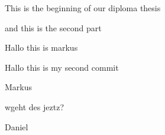 \documentclass[11pt]{scrartcl}
\begin{document}
 
    This is the beginning of our diploma thesis

    and this is the second part
    
    Hallo this is markus

    Hallo this is my second commit

    Markus

    wgeht des jeztz?

    Daniel 
\end{document}
